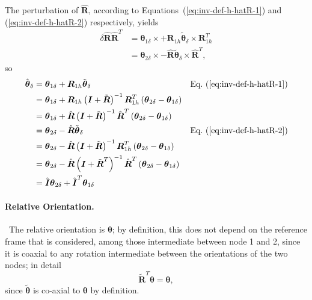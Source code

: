 \documentclass[10pt,dvips,fleqn]{report}
\newcommand{\T}[1]{\boldsymbol{#1}}
\begin{document}
The perturbation of $\hat{\T{R}}$, according 
to Equations~(\ref{eq:inv-def-h-hatR-1}) and (\ref{eq:inv-def-h-hatR-2})
respectively, yields
\begin{align}
	\delta\hat{\T{R}} \hat{\T{R}}^T
	&= \T{\theta}_{1\delta} \times
		+ \T{R}_{1h} \tilde{\T{\theta}}_{\delta}\times \T{R}_{1h}^T \\
	&= \T{\theta}_{2\delta} \times
		- \hat{\T{R}} \tilde{\T{\theta}}_{\delta}\times \hat{\T{R}}^T ,
\end{align}
so
\begin{align}
	\hat{\T{\theta}}_{\delta}
	&= \T{\theta}_{1\delta}
		+ \T{R}_{1h} \tilde{\T{\theta}}_{\delta}
		&& \text{Eq.~(\ref{eq:inv-def-h-hatR-1})} \\
	&= \T{\theta}_{1\delta}
		+ \T{R}_{1h} \plbr{\T{I} + \tilde{\T{R}}}^{-1}
		\T{R}_{1h}^T \plbr{\T{\theta}_{2\delta} - \T{\theta}_{1\delta}} \\
	&= \T{\theta}_{1\delta}
		+ \hat{\T{R}} \plbr{\T{I} + \tilde{\T{R}}}^{-1}
		\hat{\T{R}}^T \plbr{\T{\theta}_{2\delta} - \T{\theta}_{1\delta}} \\
	&= \T{\theta}_{2\delta}
		- \hat{\T{R}} \tilde{\T{\theta}}_{\delta}
		&& \text{Eq.~(\ref{eq:inv-def-h-hatR-2})} \\
	&= \T{\theta}_{2\delta}
		- \hat{\T{R}} \plbr{\T{I} + \tilde{\T{R}}}^{-1}
		\T{R}_{1h}^T \plbr{\T{\theta}_{2\delta} - \T{\theta}_{1\delta}} \\
	&= \T{\theta}_{2\delta}
		- \hat{\T{R}} \plbr{\T{I} + \tilde{\T{R}}^T}^{-1}
		\hat{\T{R}}^T \plbr{\T{\theta}_{2\delta} - \T{\theta}_{1\delta}} \\
	&= \hat{\T{I}} \T{\theta}_{2\delta}
		+ \hat{\T{I}}^T \T{\theta}_{1\delta}
\end{align}

\paragraph{Relative Orientation.} \
The relative orientation is $\T{\theta}$; by definition, this does not depend
on the reference frame that is considered, among those intermediate 
between node 1 and 2, since it is coaxial to any rotation intermediate 
between the orientations of the two nodes; in detail
\begin{equation}
	\tilde{\T{R}}^T \T{\theta} = \T{\theta} ,
\end{equation}
since $\tilde{\T{\theta}}$ is co-axial to $\T{\theta}$
by definition.
\end{document}
